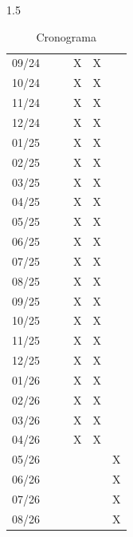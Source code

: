 \documentclass[a4paper,12pt,openright,oneside]{book}
\newenvironment{myenv}[1]
  {\begin{spacing}{#1}}
  {\end{spacing}}
\begin{document}
\begin{myenv}{1.5}
\begin{table}[htbp]
\begin{minipage}{0.45\textwidth}
\begin{tabular}{|c|c|c|c|c|c|}
						\hline
						09/24 & & & X & X & \\
						10/24 & & & X & X & \\
						11/24 & & & X & X & \\
						12/24 & & & X & X & \\
						01/25 & & & X & X & \\
						02/25 & & & X & X & \\
						03/25 & & & X & X & \\
						04/25 & & & X & X & \\
						05/25 & & & X & X & \\
						06/25 & & & X & X & \\
						07/25 & & & X & X & \\
						08/25 & & & X & X & \\
						09/25 & & & X & X & \\
						10/25 & & & X & X & \\
						11/25 & & & X & X & \\
						12/25 & & & X & X & \\
						01/26 & & & X & X & \\
						02/26 & & & X & X & \\
						03/26 & & & X & X & \\
						04/26 & & & X & X & \\
						05/26 & & & & & X \\
						06/26 & & & & & X \\
						07/26 & & & & & X \\
						08/26 & & & & & X \\
						\hline
					\end{tabular}
				\end{minipage}
				\caption{Cronograma}
			\end{table}
	\end{myenv}
\end{document}
